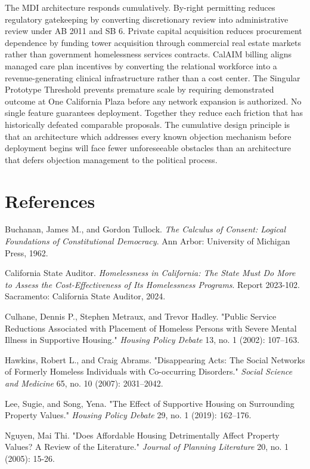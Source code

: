 \documentclass[12pt, letterpaper]{article}
\begin{document}
The MDI architecture responds cumulatively. By-right permitting reduces regulatory gatekeeping by converting discretionary review into administrative review under AB 2011 and SB 6. Private capital acquisition reduces procurement dependence by funding tower acquisition through commercial real estate markets rather than government homelessness services contracts. CalAIM billing aligns managed care plan incentives by converting the relational workforce into a revenue-generating clinical infrastructure rather than a cost center. The Singular Prototype Threshold prevents premature scale by requiring demonstrated outcome at One California Plaza before any network expansion is authorized. No single feature guarantees deployment. Together they reduce each friction that has historically defeated comparable proposals. The cumulative design principle is that an architecture which addresses every known objection mechanism before deployment begins will face fewer unforeseeable obstacles than an architecture that defers objection management to the political process.

\clearpage
{}
\section*{References}

Buchanan, James M., and Gordon Tullock. \textit{The Calculus of Consent: Logical Foundations of Constitutional Democracy}. Ann Arbor: University of Michigan Press, 1962.

California State Auditor. \textit{Homelessness in California: The State Must Do More to Assess the Cost-Effectiveness of Its Homelessness Programs}. Report 2023-102. Sacramento: California State Auditor, 2024.

Culhane, Dennis P., Stephen Metraux, and Trevor Hadley. "Public Service Reductions Associated with Placement of Homeless Persons with Severe Mental Illness in Supportive Housing." \textit{Housing Policy Debate} 13, no. 1 (2002): 107–163.

Hawkins, Robert L., and Craig Abrams. "Disappearing Acts: The Social Networks of Formerly Homeless Individuals with Co-occurring Disorders." \textit{Social Science and Medicine} 65, no. 10 (2007): 2031–2042.

Lee, Sugie, and Song, Yena. "The Effect of Supportive Housing on Surrounding Property Values." \textit{Housing Policy Debate} 29, no. 1 (2019): 162–176.

Nguyen, Mai Thi. "Does Affordable Housing Detrimentally Affect Property Values? A Review of the Literature." \textit{Journal of Planning Literature} 20, no. 1 (2005): 15-26.
\end{document}
